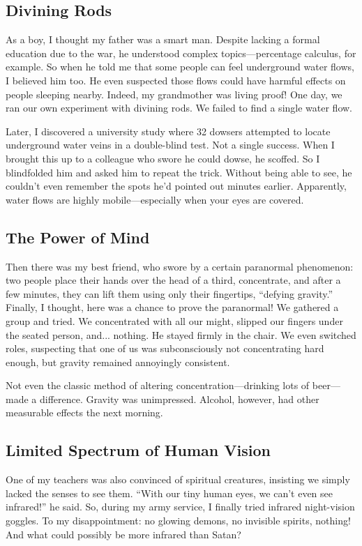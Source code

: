 \subsection*{Divining Rods}

As a boy, I thought my father was a smart man. Despite lacking a formal education due to the war, he understood complex topics—percentage calculus, for example. So when he told me that some people can feel underground water flows, I believed him too.
He even suspected those flows could have harmful effects on people sleeping nearby. Indeed, my grandmother was living proof! One day, we ran our own experiment with divining rods. We failed to find a single water flow.

Later, I discovered a university study where 32 dowsers attempted to locate underground water veins in a double-blind test. 
Not a single success. When I brought this up to a colleague who swore he could dowse, he scoffed. 
So I blindfolded him and asked him to repeat the trick. Without being able to see, he couldn't even remember the spots he’d pointed out minutes earlier. 
Apparently, water flows are highly mobile—especially when your eyes are covered.


\subsection*{The Power of Mind}

Then there was my best friend, who swore by a certain paranormal phenomenon: two people place their hands over the head of a third, concentrate, and after a few minutes, they can lift them using only their fingertips, ``defying gravity.'' Finally, I thought, here was a chance to prove the paranormal! We gathered a group and tried. We concentrated with all our might, slipped our fingers under the seated person, and... nothing. He stayed firmly in the chair. We even switched roles, suspecting that one of us was subconsciously not concentrating hard enough, but gravity remained annoyingly consistent.

Not even the classic method of altering concentration—drinking lots of beer—made a difference. Gravity was unimpressed. Alcohol, however, had other measurable effects the next morning.


\subsection*{Limited Spectrum of Human Vision}

One of my teachers was also convinced of spiritual creatures, insisting we simply lacked the senses to see them. ``With our tiny human eyes, we can't even see infrared!'' he said. So, during my army service, I finally tried infrared night-vision goggles. To my disappointment: no glowing demons, no invisible spirits, nothing! And what could possibly be more infrared than Satan?


